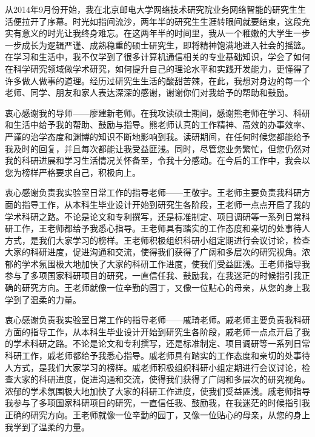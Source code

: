 
\begin{acknowledgement}
从2014年9月份开始，我在北京邮电大学网络技术研究院业务网络智能的研究生生活便拉开了序幕。时光如指间流沙，两年半的研究生生涯转眼间就要结束，这段充实有意义的时光让我终身难忘。在这两年半的时间里，我从一个稚嫩的大学生一步一步成长为逻辑严谨、成熟稳重的硕士研究生，即将精神饱满地进入社会的摇篮。在学习和生活中，我不仅学到了很多计算机通信相关的专业基础知识，学会了如何在科学研究领域做学术研究，如何提升自己的理论水平和实践开发能力，更懂得了许多做人做事的道理。经历过研究生生活的酸甜苦辣，在此，我想对身边的每一个老师、同学、朋友和家人表达深深的感谢，谢谢你们对我给予的帮助和鼓励。

衷心感谢我的导师——廖建新老师。在我攻读硕士期间，感谢熊老师在学习、科研和生活中给予我的帮助、鼓励与指导。熊老师认真的工作精神、高效的办事效率、严谨的治学态度和渊博的知识不断地影响到我。读研期间，在任何时候您都能给予我及时的回复，并且每次都能让我受益匪浅。同时，尽管您业务繁忙，但您仍然对我的科研进展和学习生活情况关怀备至，令我十分感动。在今后的工作中，我会以您为榜样严格要求自己，积极向上。

衷心感谢负责我实验室日常工作的指导老师——王敬宇。王老师主要负责我科研方面的指导工作，从本科生毕业设计开始到研究生各阶段，王老师一点点开启了我的学术科研之路。不论是论文和专利撰写，还是标准制定、项目调研等一系列日常科研工作，王老师都给予我悉心指导。王老师具有踏实的工作态度和亲切的处事待人方式，是我们大家学习的榜样。王老师积极组织科研小组定期进行会议讨论，检查大家的科研进度，促进沟通和交流，使得我们获得了广阔和多层次的研究视角。浓郁的学术氛围极大地加快了大家的科研工作进度，使我们受益匪浅。王老师指导我参与了多项国家科研项目的研究，一直信任我、鼓励我，在我迷茫的时候指引我正确的研究方向。王老师就像一位辛勤的园丁，又像一位贴心的母亲，从您的身上我学到了温柔的力量。

衷心感谢负责我实验室日常工作的指导老师——戚琦老师。戚老师主要负责我科研方面的指导工作，从本科生毕业设计开始到研究生各阶段，戚老师一点点开启了我的学术科研之路。不论是论文和专利撰写，还是标准制定、项目调研等一系列日常科研工作，戚老师都给予我悉心指导。戚老师具有踏实的工作态度和亲切的处事待人方式，是我们大家学习的榜样。戚老师积极组织科研小组定期进行会议讨论，检查大家的科研进度，促进沟通和交流，使得我们获得了广阔和多层次的研究视角。浓郁的学术氛围极大地加快了大家的科研工作进度，使我们受益匪浅。戚老师指导我参与了多项国家科研项目的研究，一直信任我、鼓励我，在我迷茫的时候指引我正确的研究方向。王老师就像一位辛勤的园丁，又像一位贴心的母亲，从您的身上我学到了温柔的力量。


\end{acknowledgement}
